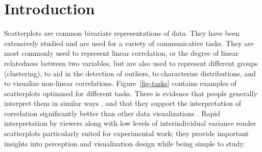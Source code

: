 \documentclass[manuscript, review, anonymous, screen]{acmart}
\begin{document}


\maketitle

\setlength{\parskip}{-0.1pt}

\hypertarget{introduction}{%
\section{Introduction}\label{introduction}}

Scatterplots are common bivariate representations of data. They have
been extensively studied and are used for a variety of communicative
tasks. They are most commonly used to represent linear correlation, or
the degree of linear relatedness between two variables, but are also
used to represent different groups (clustering), to aid in the detection
of outliers, to characterize distributions, and to visualize non-linear
correlations. Figure~\ref{fig-tasks} contains examples of scatterplots
optimised for different tasks. There is evidence that people generally
interpret them in similar ways \citep{kay_2015}, and that they support
the interpretation of correlation significantly better than other data
visualizations \citep{li_2010}. Rapid interpretation by viewers
\citep{rensink_2014} along with low levels of interindividual variance
render scatterplots particularly suited for experimental work; they
provide important insights into perception and visualization design
while being simple to study.
\end{document}
